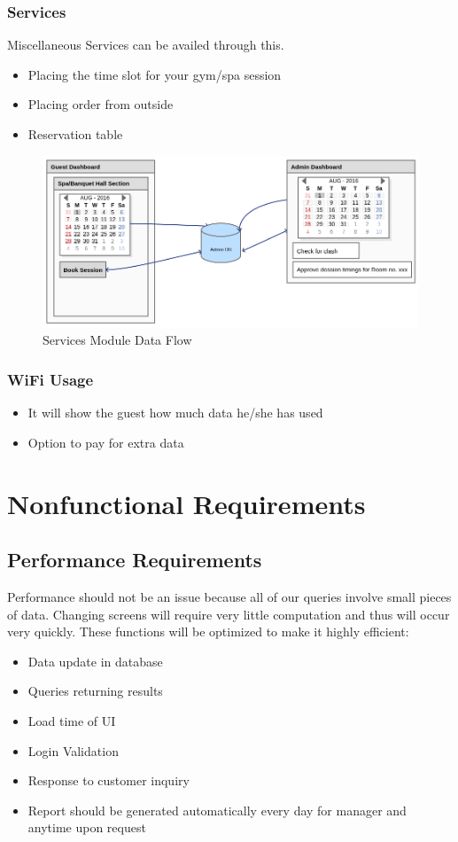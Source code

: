\documentclass{scrreprt}
\begin{document}
\subsection{Services}
Miscellaneous Services can be availed through this.
\begin{itemize}
    \item Placing the time slot for your gym/spa session
    \item Placing order from outside
    \item Reservation table
\end{itemize}
\begin{figure}
\includegraphics[scale=0.45]{spa}
\caption{Services Module Data Flow}
\end{figure}

\subsection{WiFi Usage}
\begin{itemize}
    \item It will show the guest how much data he/she has used
    \item Option to pay for extra data
\end{itemize}


\chapter{Nonfunctional Requirements}

\section{Performance Requirements}
Performance should not be an issue because all of our queries involve small pieces of
data. Changing screens will require very little computation and thus will occur very quickly.
These functions will be optimized to make it highly efficient:
\begin{itemize}
    \item Data update in database 
    \item Queries returning results 
    \item Load time of UI 
    \item Login Validation 
    \item Response to customer inquiry 
    \item Report should be generated automatically every day for manager and anytime upon request
\end{itemize}
\end{document}
